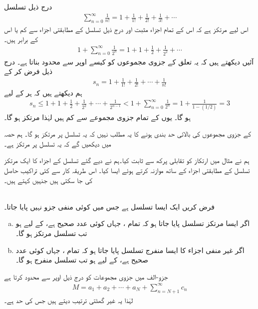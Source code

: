 درج ذیل تسلسل
\begin{align*}
\sum\limits_{n=0}^{\infty}\frac{1}{n!}=1+\frac{1}{1!}+\frac{1}{2!}+\frac{1}{3!}+\cdots
\end{align*}
 اس لیے مرتکز ہے کہ اس کے تمام اجزاء مثبت اور  درج ذیل تسلسل کے مطابقتی اجزاء سے کم  یا اس کے برابر ہیں۔
\begin{align*}
1+\sum_{n=0}^{\infty}\frac{1}{2^n}=1+1+\frac{1}{2}+\frac{1}{2^2}+\cdots
\end{align*}
آئیں دیکھتے ہیں کہ یہ تعلق   کے جزوی مجموعوں  کو کیسے اوپر سے محدود بناتا ہے۔ درج ذیل فرض کر کے
\begin{align*}
s_n=1+\frac{1}{1!}+\frac{1}{2!}+\cdots+\frac{1}{n!}
\end{align*}
ہم دیکھتے ہیں کہ ہر  کے لیے
\begin{align*}
s_n\le 1+1+\frac{1}{2}+\frac{1}{2^2}+\cdots+\frac{1}{2^{n-1}}<1+\sum_{n=0}^{\infty}\frac{1}{2^n}=1+\frac{1}{1-(1/2)}=3
\end{align*}
ہو گا۔ یوں  کے تمام جزوی مجموعے  سے کم ہیں لہٰذا  مرتکز ہو گا۔

 کے جزوی مجموعوں  کی بالائی حد بندی  ہونے کا یہ مطلب نہیں کہ یہ تسلسل  پر مرتکز ہو گا۔ ہم حصہ  میں دیکھیں گے کہ یہ تسلسل  پر مرتکز ہے۔ 

ہم نے مثال  میں ارتکاز کو تقابلی پرکھ سے ثابت کیا۔ہم نے دیے گئے تسلسل کے اجزاء کا ایک مرتکز تسلسل کے مطابقتی اجزاء کے ساتھ موازنہ کرتے ہوئے ایسا کیا۔ اس طریقہ کار سے کئی تراکیب حاصل کی  جا سکتی ہیں جنہیں  کہتے ہیں۔

\\
فرض کریں  ایک ایسا تسلسل ہے جس میں کوئی منفی جزو نہیں پایا جاتا۔
\begin{enumerate}[a.]
\item
اگر ایسا مرتکز تسلسل  پایا جاتا ہو کہ  تمام ، جہاں  کوئی عدد صحیح ہے،  کے لیے  ہو تب تسلسل  مرتکز ہو گا۔
\item
اگر غیر منفی اجزاء کا ایسا منفرج تسلسل  پایا جاتا ہو کہ  تمام ، جہاں  کوئی عدد صحیح ہے،  کے لیے  ہو تب  تسلسل  منفرج ہو گا۔
\end{enumerate}
جزو-الف میں جزوی مجموعات  کو درج ذیل اوپر سے محدود کرتا ہے
\begin{align*}
M=a_1+a_2+\cdots+a_N+\sum_{n=N+1}^{\infty}c_n
\end{align*}
لہٰذا یہ غیر گھٹتی ترتیب دیتے ہیں جس کی حد  ہے۔


